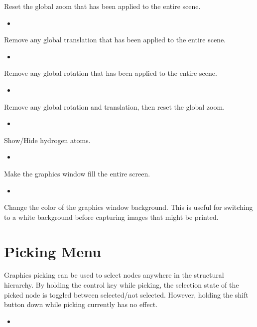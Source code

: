 \documentclass[letterpaper,11pt,english]{sphinxmanual}
\begin{document}
Reset the global zoom that has been applied to the entire scene.
\begin{itemize}
\item {} 

\end{itemize}

Remove any global translation that has been applied to the entire scene.
\begin{itemize}
\item {} 

\end{itemize}

Remove any global rotation that has been applied to the entire scene.
\begin{itemize}
\item {} 

\end{itemize}

Remove any global rotation and translation, then reset the global zoom.
\begin{itemize}
\item {} 

\end{itemize}

Show/Hide hydrogen atoms.
\begin{itemize}
\item {} 

\end{itemize}

Make the graphics window fill the entire screen.
\begin{itemize}
\item {} 

\end{itemize}

Change the color of the graphics window background. This is useful for switching to a white background before capturing images that might be printed.


\section{Picking Menu}
\label{\detokenize{text/menus:picking-menu}}
Graphics picking can be used to select nodes anywhere in the structural hierarchy. By holding the control key while picking, the selection state of the picked node is toggled between selected/not selected. However, holding the shift button down while picking currently has no effect.
\begin{itemize}
\item {} 

\end{itemize}
\end{document}
